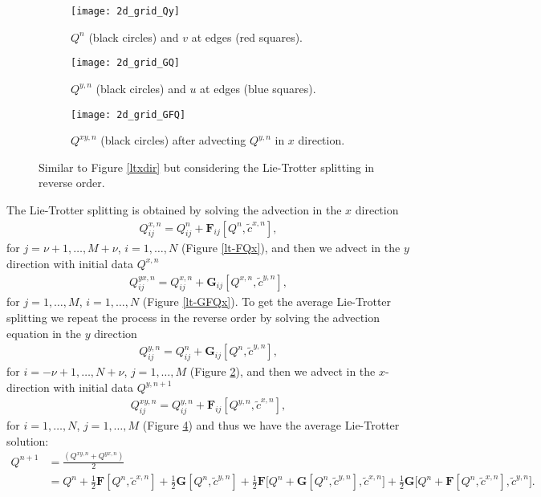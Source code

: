 \begin{figure}[!htb]
	\centering
	\begin{subfigure}{0.3\textwidth}
		\centering
		\texttt{[image: 2d\_grid\_Qy]}
		\caption{$Q^n$ (black circles) and $v$ at edges (red squares). \label{lt-Qy}}
	\end{subfigure}
	\begin{subfigure}{0.3\textwidth}
		\centering
		\texttt{[image: 2d\_grid\_GQ]}
		\caption{$Q^{y,n}$ (black circles) and $u$ at edges (blue squares).\label{lt-GQy} }
	\end{subfigure}
	\begin{subfigure}{0.3\textwidth}
		\centering
		\texttt{[image: 2d\_grid\_GFQ]}
		\caption{$Q^{xy,n}$ (black circles) after advecting $Q^{y,n}$ in $x$ direction. \label{lt-FGQy}}
	\end{subfigure}
	\caption{Similar to Figure \ref{ltxdir} but considering the Lie-Trotter splitting in reverse order.}
\end{figure}

The Lie-Trotter splitting is obtained by solving the advection in the $x$ direction
\begin{align*}
	{Q}^{x,n}_{ij} =  {Q}^{n}_{ij} + \mathbf{F}_{ij}[{Q^n}, \tilde{c}^{x,n}],
\end{align*}
for $j=\nu+1, \ldots, M+\nu$, $i=1, \ldots, N$ (Figure \ref{lt-FQx}), and then we advect in the $y$ direction with initial data ${Q}^{x,n}$ 
\begin{align*}
	{Q}^{yx,n}_{ij} = Q^{x,n}_{ij} + \mathbf{G}_{ij}[{Q}^{x,n},\tilde{c}^{y,n}],
\end{align*}
for $j=1, \ldots, M$,  $i=1, \ldots, N$  (Figure \ref{lt-GFQx}).
To get the average Lie-Trotter splitting we repeat the process in the reverse order by solving the advection equation
in the $y$ direction
\begin{align*}
	{Q}^{y,n}_{ij} =  {Q}^{n}_{ij} + \mathbf{G}_{ij}[{Q^n},\tilde{c}^{y,n}],
\end{align*}
for $i=-\nu+1, \ldots, N+\nu$, $j=1, \ldots, M$ (Figure \ref{lt-GQy}), and then we advect in the $x$-direction with initial data ${Q}^{y,n+1}$ 
\begin{align*}
	{Q}^{xy,n}_{ij} = Q^{y,n}_{ij} + \mathbf{F}_{ij}[Q^{y,n},\tilde{c}^{x,n}],
\end{align*}
for $i=1, \ldots, N$, $j=1, \ldots, M$ (Figure \ref{lt-FGQy}) and thus we have the average Lie-Trotter solution:
\begin{align*}
	Q^{n+1} &= \frac{(Q^{xy,n} + Q^{yx,n})}{2} \\
    &= Q^n + \frac{1}{2}\mathbf{F}[Q^n,\tilde{c}^{x,n}] + \frac{1}{2}\mathbf{G}[Q^n,\tilde{c}^{y,n}] + 
    \frac{1}{2}\mathbf{F}\bigg[Q^n + \mathbf{G}[Q^n, \tilde{c}^{y,n}], \tilde{c}^{x,n}\bigg]+
    \frac{1}{2}\mathbf{G}\bigg[Q^n + \mathbf{F}[Q^n, \tilde{c}^{x,n}], \tilde{c}^{y,n}\bigg].
\end{align*}

